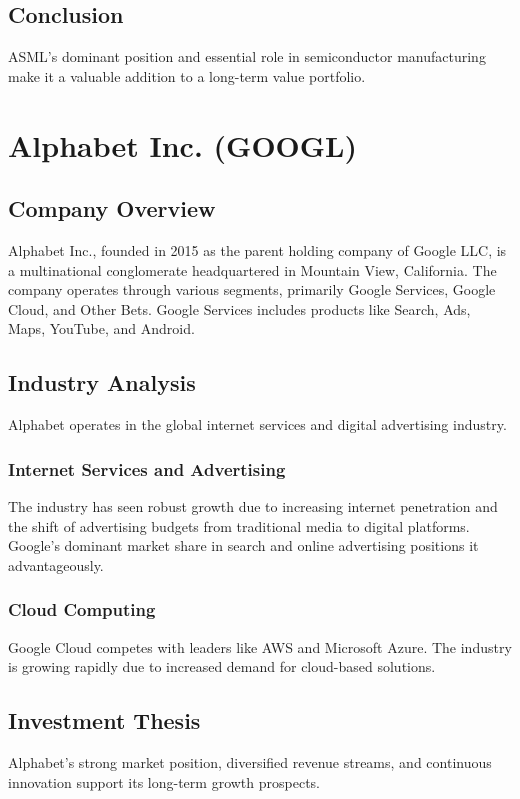 \documentclass[12pt]{report}
\begin{document}
\section{Conclusion}
ASML's dominant position and essential role in semiconductor manufacturing make it a valuable addition to a long-term value portfolio.

\chapter{Alphabet Inc. (GOOGL)}
\section{Company Overview}
Alphabet Inc., founded in 2015 as the parent holding company of Google LLC, is a multinational conglomerate headquartered in Mountain View, California. The company operates through various segments, primarily Google Services, Google Cloud, and Other Bets. Google Services includes products like Search, Ads, Maps, YouTube, and Android.

\section{Industry Analysis}
Alphabet operates in the global internet services and digital advertising industry.

\subsection{Internet Services and Advertising}
The industry has seen robust growth due to increasing internet penetration and the shift of advertising budgets from traditional media to digital platforms. Google's dominant market share in search and online advertising positions it advantageously.

\subsection{Cloud Computing}
Google Cloud competes with leaders like AWS and Microsoft Azure. The industry is growing rapidly due to increased demand for cloud-based solutions.

\section{Investment Thesis}
Alphabet's strong market position, diversified revenue streams, and continuous innovation support its long-term growth prospects.
\end{document}
